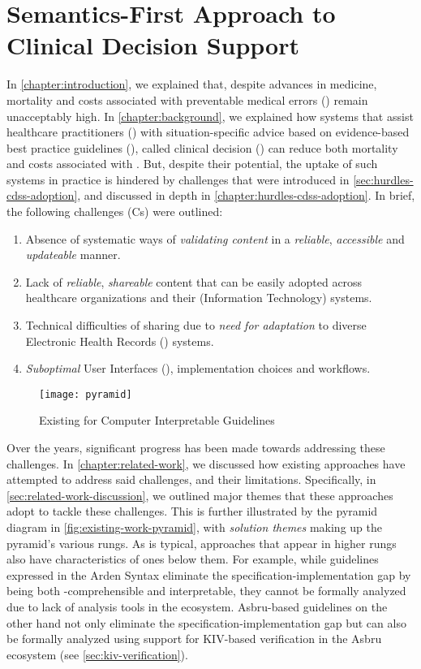 \chapter{Semantics-First Approach to Clinical Decision Support}\label{chapter:semantics-first-cdss}

In \autoref{chapter:introduction}, we explained that, despite
advances in medicine, mortality and costs associated with preventable
medical errors (\PMEs{}) remain unacceptably high. In
\autoref{chapter:background}, we explained how systems that
assist healthcare practitioners (\HCPs{}) with situation-specific
advice based on evidence-based best practice guidelines (\BPGs{}),
called clinical decision (\CDSSs{}) can reduce both mortality
and costs associated with \PMEs{}. But, despite their potential,
the uptake of such systems in practice is hindered by challenges
that were introduced in \autoref{sec:hurdles-cdss-adoption}, and
discussed in depth in \autoref{chapter:hurdles-cdss-adoption}.
In brief, the following challenges (Cs) were outlined:
\begin{enumerate}[label=C\arabic*.]
\itemsep0.0em
\item Absence of systematic ways of \emph{validating content}
in a \emph{reliable}, \emph{accessible} and \emph{updateable} manner.
\item Lack of \emph{reliable}, \emph{shareable} \CDSS{} content
that can be easily adopted across healthcare organizations and their (Information
Technology) \IT{} systems.
\item Technical difficulties of sharing due to \emph{need for
  adaptation} to diverse Electronic Health Records (\EHR) systems.
\item \emph{Suboptimal} User Interfaces (\UIs), implementation choices and
workflows.
\end{enumerate}

\begin{figure}[th!]
  \centering
  \texttt{[image: pyramid]}
  \caption{Existing \DSLs{} for Computer Interpretable Guidelines}\label{fig:existing-work-pyramid}
\end{figure}

Over the years, significant progress has been made towards
addressing these challenges. In \autoref{chapter:related-work},
we discussed how existing approaches have attempted to
address said challenges, and their limitations. Specifically,
in \autoref{sec:related-work-discussion}, we outlined major
themes that these approaches adopt to tackle these challenges.
This is further illustrated by the pyramid diagram in
\autoref{fig:existing-work-pyramid}, with \emph{solution themes}
making up the pyramid's various rungs.
As is typical, approaches that appear in higher rungs also
have characteristics of ones below them. For example, while guidelines expressed in
the Arden Syntax eliminate the specification-implementation gap by being
both \HCP{}-comprehensible and interpretable, they cannot be formally analyzed
due to lack of analysis tools in the ecosystem. Asbru-based guidelines
on the other hand not only eliminate the specification-implementation gap but can also be
formally analyzed using support for KIV-based verification in the Asbru
ecosystem (see \autoref{sec:kiv-verification}).

